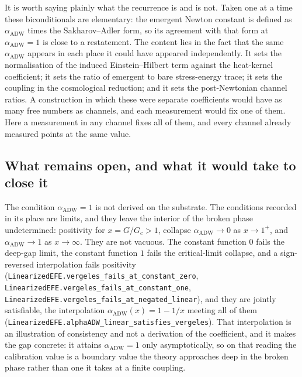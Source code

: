 \documentclass[aps,prd,nofootinbib,superscriptaddress,12pt]{revtex4-2}
\DeclareRobustCommand{\lb}{\discretionary{}{}{}}
\begin{document}
It is worth saying plainly what the recurrence is and is not. Taken one at a
time these biconditionals are elementary: the emergent Newton constant is
defined as $\alpha_{\mathrm{ADW}}$ times the Sakharov--Adler form, so its
agreement with that form at $\alpha_{\mathrm{ADW}} = 1$ is close to a
restatement. The content lies in the fact that the same $\alpha_{\mathrm{ADW}}$
appears in each place it could have appeared independently. It sets the
normalisation of the induced Einstein--Hilbert term against the heat-kernel
coefficient; it sets the ratio of emergent to bare stress-energy trace; it sets
the coupling in the cosmological reduction; and it sets the post-Newtonian
channel ratios. A construction in which these were separate coefficients would
have as many free numbers as channels, and each measurement would fix one of
them. Here a measurement in any channel fixes all of them, and every channel
already measured points at the same value.

\subsection{What remains open, and what it would take to close it}
\label{sec:efe-open}

The condition $\alpha_{\mathrm{ADW}} = 1$ is not derived on the substrate. The
conditions recorded in its place are limits, and they leave the interior of the
broken phase undetermined: positivity for $x = G/G_c > 1$, collapse
$\alpha_{\mathrm{ADW}} \to 0$ as $x \to 1^{+}$, and
$\alpha_{\mathrm{ADW}} \to 1$ as $x \to \infty$. They are not vacuous. The
constant function $0$ fails the deep-gap limit, the constant function $1$ fails
the critical-limit collapse, and a sign-reversed interpolation fails positivity
(\texttt{Linearized\lb{}EFE.\lb{}vergeles\_\lb{}fails\_\lb{}at\_\lb{}constant\_\lb{}zero},
\texttt{Linearized\lb{}EFE.\lb{}vergeles\_\lb{}fails\_\lb{}at\_\lb{}constant\_\lb{}one},
\texttt{Linearized\lb{}EFE.\lb{}vergeles\_\lb{}fails\_\lb{}at\_\lb{}negated\_\lb{}linear}), and they are
jointly satisfiable, the interpolation $\alpha_{\mathrm{ADW}}(x) = 1 - 1/x$
meeting all of them
(\texttt{Linearized\lb{}EFE.\lb{}alpha\lb{}ADW\_\lb{}linear\_\lb{}satisfies\_\lb{}vergeles}). That
interpolation is an illustration of consistency and not a derivation of the
coefficient, and it makes the gap concrete: it attains
$\alpha_{\mathrm{ADW}} = 1$ only asymptotically, so on that reading the
calibration value is a boundary value the theory approaches deep in the broken
phase rather than one it takes at a finite coupling.
\end{document}
